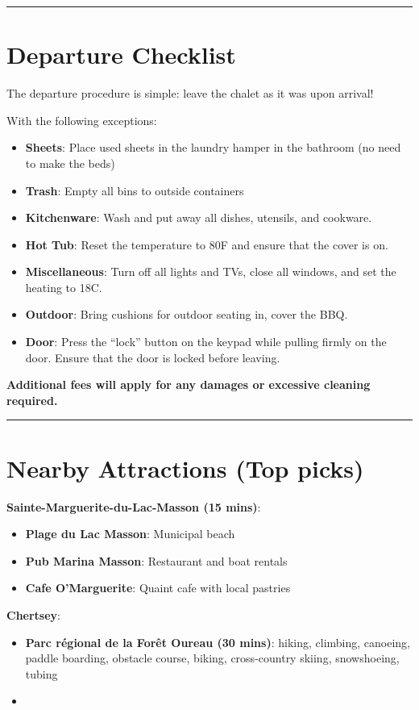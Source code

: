 \documentclass{article}
\newcommand*{\warnsign}{\begin{LARGE}\texttwemoji{warning}\end{LARGE}}
\newcommand{\separator}{\vspace{2em}\hrule}
\newcommand*{\subhead}[2]{\noindent\textbf{#1}: {#2}\vspace{1em}}
\newcommand*{\subsubhead}[2]{\noindent\textbf{#1}: {#2}\vspace{0.25em}}
\begin{document}
\separator
\section{Departure Checklist}
The departure procedure is simple: leave the chalet as it was upon arrival!

With the following exceptions:
\begin{itemize}
    \item \subsubhead{Sheets}{Place used sheets in the laundry hamper in the bathroom (no need to make the beds)}
    \item \subsubhead{Trash}{Empty all bins to outside containers}
    \item \subsubhead{Kitchenware}{Wash and put away all dishes, utensils, and cookware.}
    \item \subsubhead{Hot Tub}{Reset the temperature to 80\textdegree F and ensure that the cover is on.}
    \item \subsubhead{Miscellaneous}{Turn off all lights and TVs, close all windows, and set the heating to 18\textdegree C.}
    \item \subsubhead{Outdoor}{Bring cushions for outdoor seating in, cover the BBQ.}
    \item \subsubhead{Door}{Press the ``lock'' button on the keypad while pulling firmly on the door. Ensure that the door is locked before leaving.}
\end{itemize}
\warnsign \textbf{  Additional fees will apply for any damages or excessive cleaning required.}

\separator
\section{Nearby Attractions (Top picks)}
\subhead{Sainte-Marguerite-du-Lac-Masson (15 mins)}{}
\begin{itemize}
    \item \subsubhead{Plage du Lac Masson}{Municipal beach}
    \item \subsubhead{Pub Marina Masson}{Restaurant and boat rentals}
    \item \subsubhead{Cafe O'Marguerite}{Quaint cafe with local pastries}
\end{itemize}

\subhead{Chertsey}{}
\begin{itemize}
    \item \subsubhead{Parc régional de la Forêt Oureau (30 mins)} {hiking, climbing, canoeing, paddle boarding, obstacle course, biking, cross-country skiing, snowshoeing, tubing}
    \item {}
\end{itemize}
\end{document}
